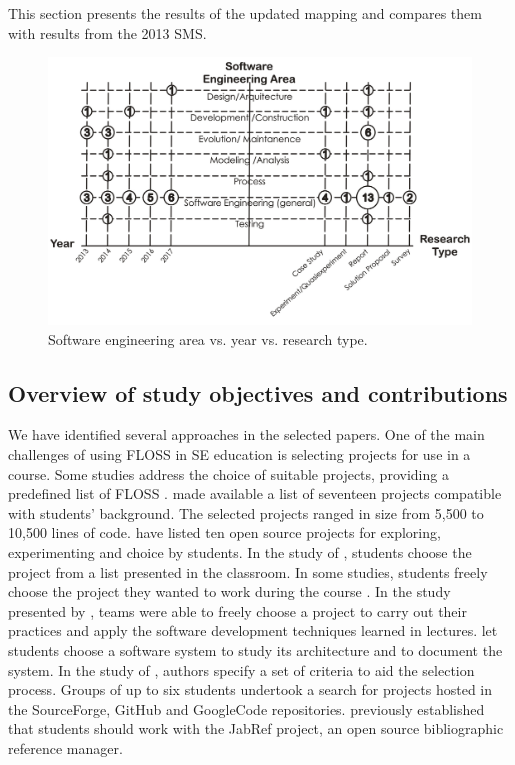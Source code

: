 This section presents the results of the updated mapping and 
compares them with results from the 2013 SMS.

\begin{figure}[t]
\includegraphics[width=0.8\linewidth]{fig/mapa01.jpg} 
\caption{Software engineering area vs. year vs. research type.} \label{fig:mapa01}
\end{figure}

\subsection{Overview of study objectives and contributions}

We have identified several approaches in the selected papers. One of the main challenges of using FLOSS in SE education is selecting projects for use in a course. Some studies address the choice of suitable projects, providing a predefined list of FLOSS \cite{id0135, id5357, id5676}. \citeauthor{id0135} made available a list of seventeen projects compatible with students' background. The selected projects ranged in size from 5,500 to 10,500 lines of code. \citeauthor{id5357} have listed ten open source projects for exploring, experimenting and choice by students. In the study of \citeauthor{id5676}, students choose the project from a list presented in the classroom. 
%
In some studies, students freely choose the project they wanted to work during the course 
\cite{id1088, id17882}. 
In the study presented by \citeauthor{id1088}, teams were able to freely choose a project to carry out their practices and apply the software development techniques learned in lectures. 
\citeauthor{id17882} let students choose a software system to study its architecture and to document the system. 
In the study of \citeauthor{id0093}, authors specify a set of criteria to aid the selection process. Groups of up to six students undertook a search for projects hosted in the SourceForge, GitHub and GoogleCode repositories. \citeauthor{id1192} previously established that students should work with the JabRef project, an open source bibliographic reference manager.


